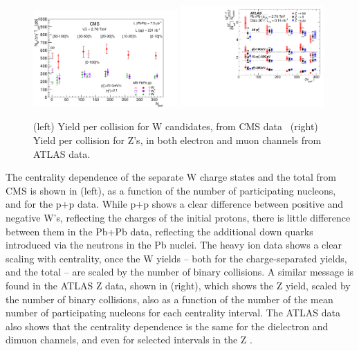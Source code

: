 \begin{figure}[!htb]
\begin{center}
\includegraphics[width=0.49\textwidth]{electroweak_figs/Fig2.pdf}
\includegraphics[width=0.49\textwidth]{electroweak_figs/fig_04.pdf}
\caption[]{(left) Yield per collision for W candidates, from CMS data~\cite{Chatrchyan:2012nt} (right) Yield per collision for Z's, in both electron and muon channels from ATLAS data.~\cite{Aad:2012ew}}
\label{fig:pas:zw_cent}
\end{center}
\end{figure}

The centrality dependence of the separate W charge states and the total from CMS is shown in \label{fig:pas:zw_cent}(left), 
as a function of the number of participating nucleons, and for the p+p data.  
While p+p shows a clear difference between positive and negative W's, reflecting the charges of the initial protons, there is little
difference between them in the Pb+Pb data, reflecting the additional down quarks introduced via the neutrons in the Pb nuclei.
The heavy ion data shows a clear scaling with centrality, once the W yields -- both for the charge-separated yields, and the
total -- are scaled by the number of binary collisions.
A similar message is found in the ATLAS Z data, shown in \label{fig:pas:zw_cent}(right), which shows the Z yield, scaled by 
the number of binary collisions, also as a function of the number of the mean number of participating nucleons for each
centrality interval.  The ATLAS data also shows that the centrality dependence is the same for the dielectron and dimuon channels,
and even for selected intervals in the Z \pT.

